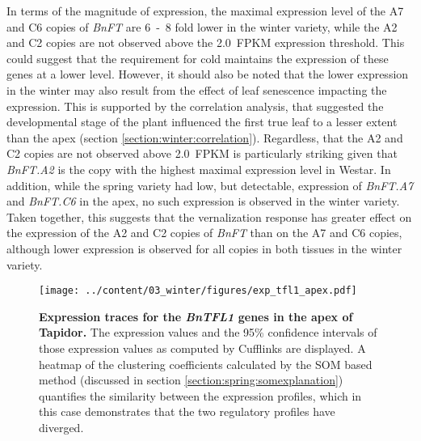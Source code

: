 \documentclass[12pt,]{book}
\begin{document}
In terms of the magnitude of expression, the maximal expression level of
the A7 and C6 copies of \emph{BnFT} are 6~-~8 fold lower in the winter
variety, while the A2 and C2 copies are not observed above the 2.0~FPKM
expression threshold. This could suggest that the requirement for cold
maintains the expression of these genes at a lower level. However, it
should also be noted that the lower expression in the winter may also
result from the effect of leaf senescence impacting the expression. This
is supported by the correlation analysis, that suggested the
developmental stage of the plant influenced the first true leaf to a
lesser extent than the apex (section \ref{section:winter:correlation}).
Regardless, that the A2 and C2 copies are not observed above 2.0~FPKM is
particularly striking given that \emph{BnFT.A2} is the copy with the
highest maximal expression level in Westar. In addition, while the
spring variety had low, but detectable, expression of \emph{BnFT.A7} and
\emph{BnFT.C6} in the apex, no such expression is observed in the winter
variety. Taken together, this suggests that the vernalization response
has greater effect on the expression of the A2 and C2 copies of
\emph{BnFT} than on the A7 and C6 copies, although lower expression is
observed for all copies in both tissues in the winter variety.

\begin{figure}[htbp]
\centering
\texttt{[image: ../content/03\_winter/figures/exp\_tfl1\_apex.pdf]}
\caption{\textbf{Expression traces for the \emph{BnTFL1} genes in the
apex of Tapidor.} The expression values and the 95\% confidence
intervals of those expression values as computed by Cufflinks are
displayed. A heatmap of the clustering coefficients calculated by the
SOM based method (discussed in section
\ref{section:spring:somexplanation}) quantifies the similarity between
the expression profiles, which in this case demonstrates that the two
regulatory profiles have diverged.}\label{figure:3xx:tfl1apex}
\end{figure}
\end{document}
